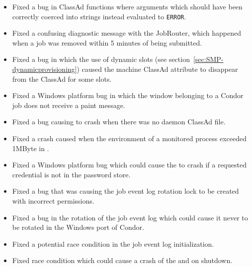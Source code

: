 \begin{itemize}

\item Fixed a bug in ClassAd functions where arguments which should have been
correctly coerced into strings instead evaluated to \texttt{ERROR}.

\item Fixed a confusing diagnostic message with the JobRouter, which happened
when a job was removed within 5 minutes of being submitted.

\item Fixed a bug in which the use of dynamic slots 
(see section~\ref{sec:SMP-dynamicprovisioning})
caused the machine ClassAd attribute 
to disappear from the ClassAd for some slots.

\item Fixed a Windows platform bug in which the window belonging to
a Condor job does not receive a paint message.

\item Fixed a bug causing   to crash when there was no 
 daemon ClassAd file.

\item Fixed a  crash caused when the environment of 
a monitored process exceeded 1MByte in .

\item Fixed a Windows platform bug which could cause the  
to crash if a requested credential is not in the password store.

\item Fixed a bug that was causing the job event log rotation lock to be
created with incorrect permissions.

\item Fixed a bug in the rotation of the job event log which could cause it
never to be rotated in the Windows port of Condor.

\item Fixed a potential race condition in the job event log initialization.

\item Fixed race condition which could cause a crash of the 
and  on shutdown.


\end{itemize}

